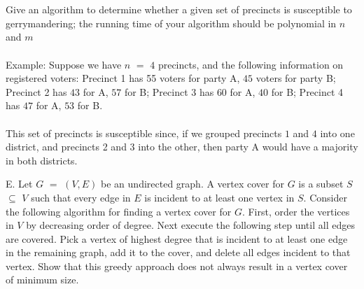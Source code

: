 \documentclass[12pt]{article}
\def\blankpage{%
      \clearpage%
      \thispagestyle{empty}%
      \addtocounter{page}{-1}%
      \null%
      \clearpage}
\begin{document}
\\\\
Give an algorithm to determine whether a given set of precincts is susceptible to gerrymandering;
the running time of your algorithm should be polynomial in $n$ and $m$
\\\\
Example: Suppose we have $n$ $=$ $4$ precincts, and the following information on registered
voters: Precinct 1 has 55 voters for party A, $45$ voters for party B; Precinct 2 has $43$ for A,
$57$ for B; Precinct 3 has $60$ for A, $40$ for B; Precinct 4 has $47$ for A, $53$ for B.
\\\\
This set of precincts is susceptible since, if we grouped precincts $1$ and $4$ into one district,
and precincts 2 and 3 into the other, then party A would have a majority in both districts.
\blankpage
\newpage
\noindent E. Let $G$ $=$ $(V,E)$ be an undirected graph. A vertex cover for $G$ is a subset
$S$ $\subseteq$ $V$ such that every edge in $E$ is incident to at least one vertex in $S$.
Consider the following algorithm for finding a vertex cover for $G$. First,
order the vertices in $V$ by decreasing order of degree. Next execute the following
step until all edges are covered. Pick a vertex of highest degree that
is incident to at least one edge in the remaining graph, add it to the cover,
and delete all edges incident to that vertex. Show that this greedy approach
does not always result in a vertex cover of minimum size.
\end{document}
